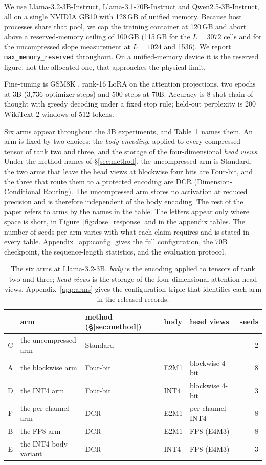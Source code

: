 \documentclass[11pt,letterpaper]{article}
\begin{document}
We use Llama-3.2-3B-Instruct, Llama-3.1-70B-Instruct and Qwen2.5-3B-Instruct, all on a single NVIDIA GB10 with 128\,GB of unified memory. Because host processes share that pool, we cap the training container at 120\,GB and abort above a reserved-memory ceiling of 100\,GB (115\,GB for the $L{=}3072$ cells and for the uncompressed slope measurement at $L{=}1024$ and 1536). We report \texttt{max\_memory\_reserved} throughout. On a unified-memory device it is the reserved figure, not the allocated one, that approaches the physical limit.

Fine-tuning is GSM8K \citep{cobbe2021gsm8k}, rank-16 LoRA on the attention projections, two epochs at 3B (3{,}736 optimizer steps) and 500 steps at 70B. Accuracy is 8-shot chain-of-thought with greedy decoding under a fixed stop rule; held-out perplexity is 200 WikiText-2 windows of 512 tokens.


Six arms appear throughout the 3B experiments, and Table~\ref{tab:arms} names them. An arm is fixed by two choices: the \emph{body encoding}, applied to every compressed tensor of rank two and three, and the storage of the four-dimensional \emph{head views}. Under the method names of \S\ref{sec:method}, the uncompressed arm is Standard, the two arms that leave the head views at blockwise four bits are Four-bit, and the three that route them to a protected encoding are DCR (Dimension-Conditional Routing). The uncompressed arm stores no activation at reduced precision and is therefore independent of the body encoding. The rest of the paper refers to arms by the names in the table. The letters appear only where space is short, in Figure~\ref{fig:dose_response} and in the appendix tables. The number of seeds per arm varies with what each claim requires and is stated in every table. Appendix~\ref{app:config} gives the full configuration, the 70B checkpoint, the sequence-length statistics, and the evaluation protocol.

\begin{table}[htbp]
\centering
\small
\caption{The six arms at Llama-3.2-3B. \emph{body} is the encoding applied to tensors of rank two and three; \emph{head views} is the storage of the four-dimensional attention head views. Appendix~\ref{app:arms} gives the configuration triple that identifies each arm in the released records.}
\label{tab:arms}
\begin{tabular}{cllllr}
\toprule
& arm & method (\S\ref{sec:method}) & body & head views & seeds \\
\midrule
C & the uncompressed arm    & Standard & ---  & ---              & 2 \\
A & the blockwise arm       & Four-bit & E2M1 & blockwise 4-bit  & 8 \\
D & the INT4 arm            & Four-bit & INT4 & blockwise 4-bit  & 3 \\
F & the per-channel arm     & DCR      & E2M1 & per-channel INT4 & 8 \\
B & the FP8 arm             & DCR      & E2M1 & FP8 (E4M3)       & 8 \\
E & the INT4-body variant   & DCR      & INT4 & FP8 (E4M3)       & 3 \\
\bottomrule
\end{tabular}
\end{table}
\end{document}

